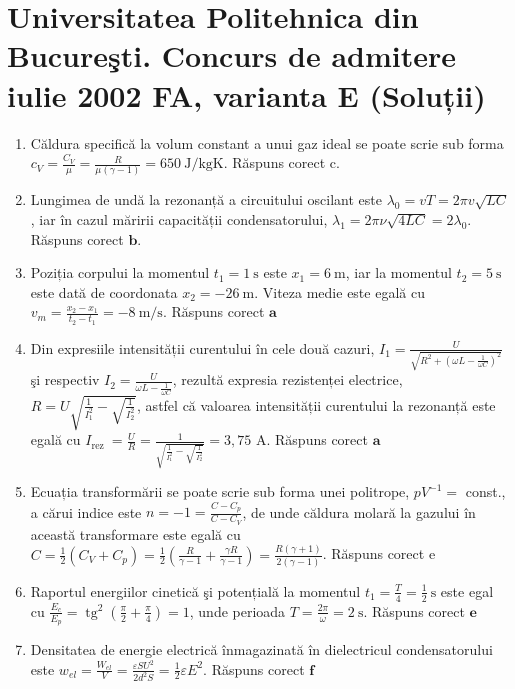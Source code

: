 \section*{Universitatea Politehnica din Bucureşti. Concurs de admitere iulie 2002 FA, varianta E (Soluții)}
\begin{enumerate}
  \item Căldura specifică la volum constant a unui gaz ideal se poate scrie sub forma $c_{V}=\frac{C_{V}}{\mu}=\frac{R}{\mu(\gamma-1)}=650 \mathrm{~J} / \mathrm{kgK}$. Răspuns corect c.
  \item Lungimea de undă la rezonanță a circuitului oscilant este $\lambda_{0}=v T=2 \pi v \sqrt{L C}$, iar în cazul măririi capacității condensatorului, $\lambda_{1}=2 \pi \nu \sqrt{4 L C}=2 \lambda_{0}$. Răspuns corect $\boldsymbol{b}$.
  \item Poziția corpului la momentul $t_{1}=1 \mathrm{~s}$ este $x_{1}=6 \mathrm{~m}$, iar la momentul $t_{2}=5 \mathrm{~s}$ este dată de coordonata $x_{2}=-26 \mathrm{~m}$. Viteza medie este egală cu $v_{m}=\frac{x_{2}-x_{1}}{t_{2}-t_{1}}=-8 \mathrm{~m} / \mathrm{s}$. Răspuns corect $\boldsymbol{a}$
  \item Din expresiile intensității curentului în cele două cazuri, $I_{1}=\frac{U}{\sqrt{R^{2}+\left(\omega L-\frac{1}{\omega C}\right)^{2}}}$ şi respectiv $I_{2}=\frac{U}{\omega L-\frac{1}{\omega C}}$, rezultă expresia rezistenței electrice, $R=U \sqrt{\frac{1}{I_{1}^{2}}-\sqrt{\frac{1}{I_{2}^{2}}}}$, astfel că valoarea intensității curentului la rezonanță este egală cu $I_{\text {rez }}=\frac{U}{R}=\frac{1}{\sqrt{\frac{1}{I_{1}^{2}}-\sqrt{\frac{1}{I_{2}^{2}}}}}=3,75$ A. Răspuns corect $\boldsymbol{a}$
  \item Ecuația transformării se poate scrie sub forma unei politrope, $p V^{-1}=$ const., a cărui indice este $n=-1=\frac{C-C_{p}}{C-C_{V}}$, de unde căldura molară la gazului în această transformare este egală cu\\
$C=\frac{1}{2}\left(C_{V}+C_{p}\right)=\frac{1}{2}\left(\frac{R}{\gamma-1}+\frac{\gamma R}{\gamma-1}\right)=\frac{R(\gamma+1)}{2(\gamma-1)}$. Răspuns corect e
  \item Raportul energiilor cinetică şi potențială la momentul $t_{1}=\frac{T}{4}=\frac{1}{2} \mathrm{~s}$ este egal cu $\frac{E_{c}}{E_{p}}=\operatorname{tg}^{2}\left(\frac{\pi}{2}+\frac{\pi}{4}\right)=1$, unde perioada $T=\frac{2 \pi}{\omega}=2 \mathrm{~s}$. Răspuns corect $\boldsymbol{e}$
  \item Densitatea de energie electrică înmagazinată în dielectricul condensatorului este $w_{e l}=\frac{W_{e l}}{V}=\frac{\varepsilon S U^{2}}{2 d^{2} S}=\frac{1}{2} \varepsilon E^{2}$. Răspuns corect $\boldsymbol{f}$

\end{enumerate}
